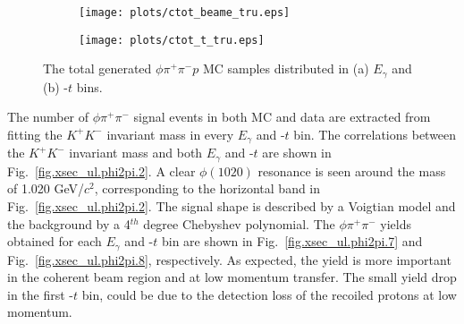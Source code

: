 \begin{figure}[H]
    \centering
    \begin{subfigure}[b]{0.5\textwidth}
        \texttt{[image: plots/ctot\_beame\_tru.eps]}
        \caption{}
        \label{fig.xsec_ul.phi2pi.1.a}
    \end{subfigure}\hfill
    \begin{subfigure}[b]{0.5\textwidth}
        \texttt{[image: plots/ctot\_t\_tru.eps]}
        \caption{}
        \label{fig.xsec_ul.phi2pi.1.b}
    \end{subfigure}
    \caption{\label{fig.xsec_ul.phi2pi.1}The total generated $\phi \pi^{+} \pi^{-} p$ MC samples distributed in (a) $E_{\gamma}$ and (b) -$t$ bins.}
\end{figure}

The number of $\phi \pi^{+} \pi^{-}$ signal events in both MC and data are extracted from fitting the $K^+K^-$ invariant mass in every $E_{\gamma}$ and -$t$ bin. The correlations between the $K^+K^-$ invariant mass and both $E_{\gamma}$ and -$t$ are shown in Fig.~\ref{fig.xsec_ul.phi2pi.2}. A clear $\phi(1020)$ resonance is seen around the mass of 1.020 GeV/$c^2$, corresponding to the horizontal band in Fig.~\ref{fig.xsec_ul.phi2pi.2}. The signal shape is described by a Voigtian model and the background by a 4$^{th}$ degree Chebyshev polynomial. The $\phi \pi^{+} \pi^{-}$ yields obtained for each $E_{\gamma}$ and -$t$ bin are shown in Fig.~\ref{fig.xsec_ul.phi2pi.7} and Fig.~\ref{fig.xsec_ul.phi2pi.8}, respectively. As expected, the yield is more important in the coherent beam region and at low momentum transfer. The small yield drop in the first -$t$ bin, could be due to the detection loss of the recoiled protons at low momentum.


